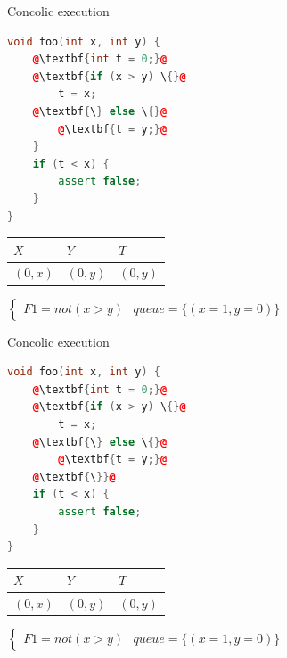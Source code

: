 \documentclass{beamer}
\begin{document}
\begin{frame}[fragile]{Concolic execution}
\begin{minipage}{0.49\textwidth}
\begin{lstlisting}[language=C++,escapechar=@]
void foo(int x, int y) {
    @\textbf{int t = 0;}@
    @\textbf{if (x > y) \{}@
        t = x;
    @\textbf{\} else \{}@
        @\textbf{t = y;}@
    }
    if (t < x) {
        assert false;
    }
}
\end{lstlisting}
\end{minipage}
\hfill
\begin{minipage}{0.49\textwidth}
\begin{center}
\begin{tabular}{ | l | l | l | }
\hline
$X$ & $Y$ & $T$ \\
\hline
$(0, x)$ & $(0, y)$ & $(0, y)$ \\
\hline
\end{tabular}
$\left\{
\begin{array}{l}
F1 = not (x > y)
\end{array}
\right.$
$queue = \{(x = 1, y = 0)\}$
\end{center}
\end{minipage}
\end{frame}

\begin{frame}[fragile]{Concolic execution}
\begin{minipage}{0.49\textwidth}
\begin{lstlisting}[language=C++,escapechar=@]
void foo(int x, int y) {
    @\textbf{int t = 0;}@
    @\textbf{if (x > y) \{}@
        t = x;
    @\textbf{\} else \{}@
        @\textbf{t = y;}@
    @\textbf{\}}@
    if (t < x) {
        assert false;
    }
}
\end{lstlisting}
\end{minipage}
\hfill
\begin{minipage}{0.49\textwidth}
\begin{center}
\begin{tabular}{ | l | l | l | }
\hline
$X$ & $Y$ & $T$ \\
\hline
$(0, x)$ & $(0, y)$ & $(0, y)$ \\
\hline
\end{tabular}
$\left\{
\begin{array}{l}
F1 = not (x > y)
\end{array}
\right.$
$queue = \{(x = 1, y = 0)\}$
\end{center}
\end{minipage}
\end{frame}
\end{document}
